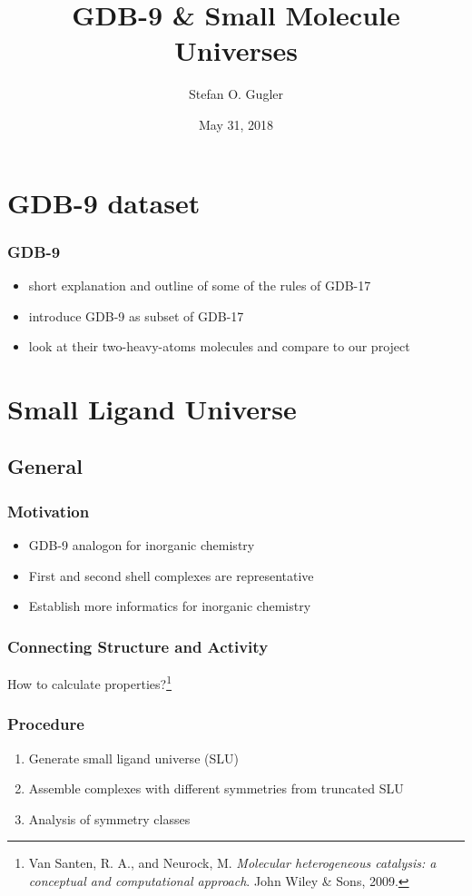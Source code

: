 \documentclass[xcolor=dvipsnames]{beamer}
\title[Group Meeting]{GDB-9 \& Small Molecule Universes}
\date{May 31, 2018}
\author[Stefan O. Gugler]
{Stefan O. Gugler}
\institute[MIT]{Massachusetts Institute of Technology  \\Department of Chemical Engineering}
\begin{document}
	
\begin{frame}
	\titlepage
\end{frame}
%
\begin{frame}
	\tableofcontents
\end{frame}

\section{GDB-9 dataset}
\begin{frame}
\frametitle{GDB-9}
\begin{itemize}
\item short explanation and outline of some of the rules of GDB-17
\item introduce GDB-9 as subset of GDB-17
\item look at their two-heavy-atoms molecules and compare to our project
\end{itemize}
	
\end{frame}

\section{Small Ligand Universe}
\subsection{General}
\begin{frame}
\frametitle{Motivation}
\begin{itemize}
\item GDB-9 analogon for inorganic chemistry
\item First and second shell complexes are representative
\item Establish more informatics for inorganic chemistry
\end{itemize}
\end{frame}

\begin{frame}\frametitle{Connecting Structure and Activity}
How to calculate properties?\footnote{\tiny{Van Santen, R. A., and Neurock, M. \textit{Molecular heterogeneous catalysis: a conceptual and computational approach}. John Wiley \& Sons, 2009.}}

\end{frame}

\begin{frame}
\frametitle{Procedure}
\begin{enumerate}
\item Generate small ligand universe (SLU)
\item Assemble complexes with different symmetries from truncated SLU
\item Analysis of symmetry classes 
\end{enumerate}
\end{frame}
\end{document}
